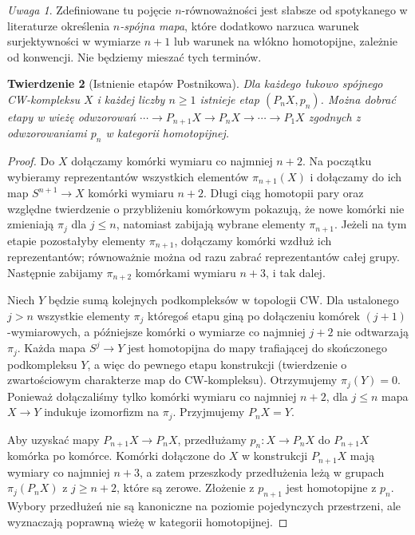 \documentclass[11pt,a4paper,oneside]{report}
\theoremstyle{plain}
\newtheorem{twierdzenie}{Twierdzenie}[section]
\theoremstyle{definition}
\theoremstyle{remark}
\newtheorem{uwaga}[twierdzenie]{Uwaga}
\begin{document}
\begin{uwaga}
Zdefiniowane tu pojęcie $n$-równoważności jest słabsze
od spotykanego w literaturze określenia \emph{$n$-spójna mapa},
które dodatkowo narzuca warunek surjektywności w wymiarze
$n+1$ lub warunek na włókno homotopijne, zależnie od
konwencji. Nie będziemy mieszać tych terminów.
\end{uwaga}

\begin{twierdzenie}[Istnienie etapów Postnikowa]
\label{thm:postnikow-istence-v7}
Dla każdego łukowo spójnego CW-kompleksu $X$ i każdej
liczby $n\ge1$ istnieje etap $(P_nX,p_n)$.
Można dobrać etapy w wieżę odwzorowań
$\cdots\to P_{n+1}X\to P_nX\to\cdots\to P_1X$
zgodnych z odwzorowaniami $p_n$ w kategorii homotopijnej.
\end{twierdzenie}
\begin{proof}
Do $X$ dołączamy komórki wymiaru co najmniej $n+2$.
Na początku wybieramy reprezentantów wszystkich elementów
$\pi_{n+1}(X)$ i dołączamy do ich map
$S^{n+1}\to X$ komórki wymiaru $n+2$.
Długi ciąg homotopii pary oraz względne twierdzenie
o przybliżeniu komórkowym pokazują, że nowe komórki
nie zmieniają $\pi_j$ dla $j\le n$, natomiast zabijają
wybrane elementy $\pi_{n+1}$. Jeżeli na tym etapie
pozostałyby elementy $\pi_{n+1}$, dołączamy komórki
wzdłuż ich reprezentantów; równoważnie można od razu
zabrać reprezentantów całej grupy. Następnie zabijamy
$\pi_{n+2}$ komórkami wymiaru $n+3$, i tak dalej.

Niech $Y$ będzie sumą kolejnych podkompleksów w topologii
CW. Dla ustalonego $j>n$ wszystkie elementy $\pi_j$
któregoś etapu giną po dołączeniu komórek $(j+1)$-wymiarowych,
a późniejsze komórki o wymiarze co najmniej $j+2$
nie odtwarzają $\pi_j$. Każda mapa $S^j\to Y$ jest
homotopijna do mapy trafiającej do skończonego podkompleksu
$Y$, a więc do pewnego etapu konstrukcji (twierdzenie
o zwartościowym charakterze map do CW-kompleksu).
Otrzymujemy $\pi_j(Y)=0$. Ponieważ dołączaliśmy tylko
komórki wymiaru co najmniej $n+2$, dla $j\le n$
mapa $X\to Y$ indukuje izomorfizm na $\pi_j$.
Przyjmujemy $P_nX=Y$.

Aby uzyskać mapy $P_{n+1}X\to P_nX$, przedłużamy
$p_n:X\to P_nX$ do $P_{n+1}X$ komórka po komórce.
Komórki dołączone do $X$ w konstrukcji $P_{n+1}X$
mają wymiary co najmniej $n+3$, a zatem przeszkody
przedłużenia leżą w grupach $\pi_j(P_nX)$ z $j\ge n+2$,
które są zerowe. Złożenie z $p_{n+1}$ jest homotopijne
z $p_n$. Wybory przedłużeń nie są kanoniczne na poziomie
pojedynczych przestrzeni, ale wyznaczają poprawną wieżę
w kategorii homotopijnej.
\end{proof}
\end{document}
